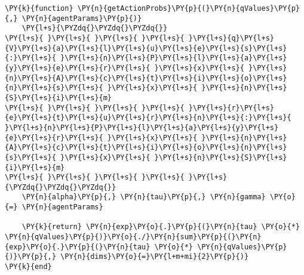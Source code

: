 \documentclass[main.tex]{subfiles}
\begin{document}
    \begin{tcolorbox}[breakable, size=fbox, boxrule=1pt, pad at break*=1mm,colback=cellbackground, colframe=cellborder]
\begin{Verbatim}[commandchars=\\\{\}]
\PY{k}{function} \PY{n}{getActionProbs}\PY{p}{(}\PY{n}{qValues}\PY{p}{,} \PY{n}{agentParams}\PY{p}{)}
    \PY{l+s}{\PYZdq{}\PYZdq{}\PYZdq{}}
\PY{l+s}{ }\PY{l+s}{ }\PY{l+s}{ }\PY{l+s}{ }\PY{l+s}{q}\PY{l+s}{V}\PY{l+s}{a}\PY{l+s}{l}\PY{l+s}{u}\PY{l+s}{e}\PY{l+s}{s}\PY{l+s}{:}\PY{l+s}{ }\PY{l+s}{n}\PY{l+s}{P}\PY{l+s}{l}\PY{l+s}{a}\PY{l+s}{y}\PY{l+s}{e}\PY{l+s}{r}\PY{l+s}{ }\PY{l+s}{x}\PY{l+s}{ }\PY{l+s}{n}\PY{l+s}{A}\PY{l+s}{c}\PY{l+s}{t}\PY{l+s}{i}\PY{l+s}{o}\PY{l+s}{n}\PY{l+s}{s}\PY{l+s}{ }\PY{l+s}{x}\PY{l+s}{ }\PY{l+s}{n}\PY{l+s}{S}\PY{l+s}{i}\PY{l+s}{m}
\PY{l+s}{ }\PY{l+s}{ }\PY{l+s}{ }\PY{l+s}{ }\PY{l+s}{r}\PY{l+s}{e}\PY{l+s}{t}\PY{l+s}{u}\PY{l+s}{r}\PY{l+s}{n}\PY{l+s}{:}\PY{l+s}{ }\PY{l+s}{n}\PY{l+s}{P}\PY{l+s}{l}\PY{l+s}{a}\PY{l+s}{y}\PY{l+s}{e}\PY{l+s}{r}\PY{l+s}{ }\PY{l+s}{x}\PY{l+s}{ }\PY{l+s}{n}\PY{l+s}{A}\PY{l+s}{c}\PY{l+s}{t}\PY{l+s}{i}\PY{l+s}{o}\PY{l+s}{n}\PY{l+s}{s}\PY{l+s}{ }\PY{l+s}{x}\PY{l+s}{ }\PY{l+s}{n}\PY{l+s}{S}\PY{l+s}{i}\PY{l+s}{m}
\PY{l+s}{ }\PY{l+s}{ }\PY{l+s}{ }\PY{l+s}{ }\PY{l+s}{\PYZdq{}\PYZdq{}\PYZdq{}}
    \PY{n}{alpha}\PY{p}{,} \PY{n}{tau}\PY{p}{,} \PY{n}{gamma} \PY{o}{=} \PY{n}{agentParams}
    
    \PY{k}{return} \PY{n}{exp}\PY{o}{.}\PY{p}{(}\PY{n}{tau} \PY{o}{*} \PY{n}{qValues}\PY{p}{)}\PY{o}{./}\PY{n}{sum}\PY{p}{(}\PY{n}{exp}\PY{o}{.}\PY{p}{(}\PY{n}{tau} \PY{o}{*} \PY{n}{qValues}\PY{p}{)}\PY{p}{,} \PY{n}{dims}\PY{o}{=}\PY{l+m+mi}{2}\PY{p}{)}
\PY{k}{end}
\end{Verbatim}
\end{tcolorbox}
\end{document}

